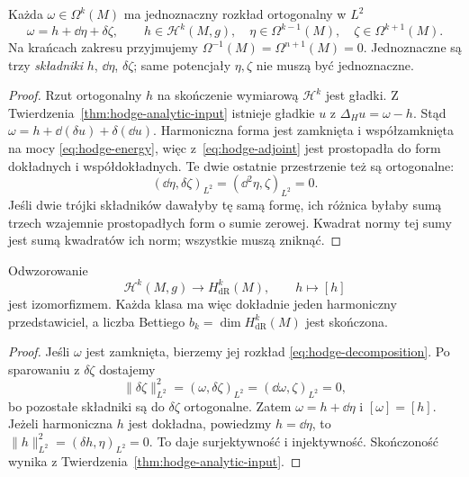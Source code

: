 \begin{twierdzenie}
\label{thm:hodge-decomposition}
Każda $\omega\in\Omega^k(M)$ ma jednoznaczny rozkład
ortogonalny w $L^2$
\begin{equation}\label{eq:hodge-decomposition}
 \omega=h+\dd\eta+\delta\zeta,
 \qquad h\in\mathcal H^k(M,g),\quad
 \eta\in\Omega^{k-1}(M),\quad
 \zeta\in\Omega^{k+1}(M).
\end{equation}
Na krańcach zakresu przyjmujemy
$\Omega^{-1}(M)=\Omega^{n+1}(M)=0$.
Jednoznaczne są trzy \emph{składniki} $h$, $\dd\eta$,
$\delta\zeta$; same potencjały $\eta,\zeta$
nie muszą być jednoznaczne.
\end{twierdzenie}
\begin{proof}
Rzut ortogonalny $h$ na skończenie wymiarową
$\mathcal H^k$ jest gładki. Z
Twierdzenia~\ref{thm:hodge-analytic-input} istnieje
gładkie $u$ z $\Delta_Hu=\omega-h$.
Stąd $\omega=h+\dd(\delta u)+\delta(\dd u)$.
Harmoniczna forma jest zamknięta i współzamknięta na mocy
\eqref{eq:hodge-energy}, więc z~\eqref{eq:hodge-adjoint}
jest prostopadła do form dokładnych i współdokładnych.
Te dwie ostatnie przestrzenie też są ortogonalne:
\[
 (\dd\eta,\delta\zeta)_{L^2}
 =(\dd^2\eta,\zeta)_{L^2}=0.
\]
Jeśli dwie trójki składników dawałyby tę samą formę,
ich różnica byłaby sumą trzech wzajemnie prostopadłych
form o sumie zerowej. Kwadrat normy tej sumy jest sumą
kwadratów ich norm; wszystkie muszą zniknąć.
\end{proof}

\begin{wniosek}
\label{cor:hodge-de-rham}
Odwzorowanie
\[
 \mathcal H^k(M,g)\longrightarrow H^k_{\mathrm{dR}}(M),
 \qquad h\longmapsto[h]
\]
jest izomorfizmem. Każda klasa ma więc dokładnie jeden
harmoniczny przedstawiciel, a liczba Bettiego
$b_k=\dim H^k_{\mathrm{dR}}(M)$ jest skończona.
\end{wniosek}
\begin{proof}
Jeśli $\omega$ jest zamknięta, bierzemy jej rozkład
\eqref{eq:hodge-decomposition}. Po sparowaniu z
$\delta\zeta$ dostajemy
\[
 \|\delta\zeta\|_{L^2}^2
 =(\omega,\delta\zeta)_{L^2}
 =(\dd\omega,\zeta)_{L^2}=0,
\]
bo pozostałe składniki są do $\delta\zeta$
ortogonalne. Zatem $\omega=h+\dd\eta$ i $[\omega]=[h]$.
Jeżeli harmoniczna $h$ jest dokładna, powiedzmy
$h=\dd\eta$, to
$\|h\|_{L^2}^2=(\delta h,\eta)_{L^2}=0$.
To daje surjektywność i injektywność. Skończoność
wynika z Twierdzenia~\ref{thm:hodge-analytic-input}.
\end{proof}

